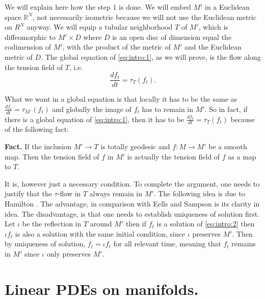 We will explain here how the step 1 is done. We will embed \(M'\) in a Euclidean space
\(\mathbb{R}^N\), not necessarily isometric because we will not use the Euclidean metric
on \(R^N\) anyway. We will equip a tubular neighborhood \(T\) of \(M'\), which is
diffeomorphic to \(M'\times D\) where \(D\) is an open disc of dimension equal the
codimension of \(M'\), with the product of the metric of \(M'\) and the Euclidean
metric of \(D\). The global equation of \eqref{eq:intro:1}, as we will prove, is the flow
along the tension field of \(T\), i.e. 
\begin{equation}
\label{eq:intro:2}
\frac{df_t}{dt} = \tau_T(f_t). 
\end{equation}

What we want in a global equation is that locally
it has to be the same as \(\frac{df_t}{dt} = \tau_{M'}(f_t)\) and globally the image of \(f_t\) has to remain in \(M'\). So in fact, if there is a global equation of \eqref{eq:intro:1}, then it has to be \(\frac{df_t}{dt} = \tau_T(f_t)\) because of the following fact:

\textbf{Fact.} If the inclusion \(M' \longrightarrow T\) is totally geodesic and \(f: M
\longrightarrow M'\) be a smooth map. Then the tension field of \(f\) in \(M'\) is
actually the tension field of \(f\) as a map to \(T\).

It is, however just a necessary condition. To complete the argument, one needs to justify
that the \(\tau\)-flow in \(T\) always remain in \(M'\). The following idea is due
to Hamilton \cite{hamilton_harmonic_1975}. The advantage, in comparison with Eells and
Sampson \cite{eells_harmonic_1964} is its clarity in idea. The disadvantage, is that one needs to
establish uniqueness of solution first. Let \(\iota\) be the reflection in \(T\)
around \(M'\) then if \(f_t\) is a solution of \eqref{eq:intro:2} then \(\iota f_t\)
is also a solution with the same initial condition, since \(\iota\) preserves \(M'\). Then by uniqueness of solution, \(f_t = \iota f_t\) for all relevant time, meaning
that \(f_t\) remains in \(M'\) since \(\iota\) only preserves \(M'\).

\section{Linear PDEs on manifolds.}
\label{sec:orga7f5a8f}

